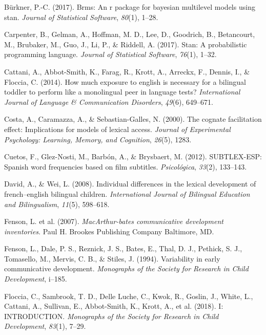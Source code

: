 \documentclass[
  letterpaper,
  DIV=11,
  numbers=noendperiod]{scrartcl}
\newlength{\cslhangindent}
\newlength{\cslentryspacingunit} %
\newenvironment{CSLReferences}[2] %
 {%
  \setlength{\parindent}{0pt}
  \ifodd #1
  \let\oldpar\par
  \def\par{\hangindent=\cslhangindent\oldpar}
  \fi
  \setlength{\parskip}{#2\cslentryspacingunit}
 }%
 {}
\begin{document}
\begin{CSLReferences}{1}{0}
\leavevmode{}%
Bürkner, P.-C. (2017). Brms: An r package for bayesian multilevel models
using stan. \emph{Journal of Statistical Software}, \emph{80}(1), 1--28.

\leavevmode{}%
Carpenter, B., Gelman, A., Hoffman, M. D., Lee, D., Goodrich, B.,
Betancourt, M., Brubaker, M., Guo, J., Li, P., \& Riddell, A. (2017).
Stan: A probabilistic programming language. \emph{Journal of Statistical
Software}, \emph{76}(1), 1--32.

\leavevmode{}%
Cattani, A., Abbot-Smith, K., Farag, R., Krott, A., Arreckx, F., Dennis,
I., \& Floccia, C. (2014). How much exposure to english is necessary for
a bilingual toddler to perform like a monolingual peer in language
tests? \emph{International Journal of Language \& Communication
Disorders}, \emph{49}(6), 649--671.

\leavevmode{}%
Costa, A., Caramazza, A., \& Sebastian-Galles, N. (2000). The cognate
facilitation effect: Implications for models of lexical access.
\emph{Journal of Experimental Psychology: Learning, Memory, and
Cognition}, \emph{26}(5), 1283.

\leavevmode{}%
Cuetos, F., Glez-Nosti, M., Barbón, A., \& Brysbaert, M. (2012).
SUBTLEX-ESP: Spanish word frequencies based on film subtitles.
\emph{Psicol{ó}gica}, \emph{33}(2), 133--143.

\leavevmode{}%
David, A., \& Wei, L. (2008). Individual differences in the lexical
development of french--english bilingual children. \emph{International
Journal of Bilingual Education and Bilingualism}, \emph{11}(5),
598--618.

\leavevmode{}%
Fenson, L. et al. (2007). \emph{MacArthur-bates communicative
development inventories}. Paul H. Brookes Publishing Company Baltimore,
MD.

\leavevmode{}%
Fenson, L., Dale, P. S., Reznick, J. S., Bates, E., Thal, D. J.,
Pethick, S. J., Tomasello, M., Mervis, C. B., \& Stiles, J. (1994).
Variability in early communicative development. \emph{Monographs of the
Society for Research in Child Development}, i--185.

\leavevmode{}%
Floccia, C., Sambrook, T. D., Delle Luche, C., Kwok, R., Goslin, J.,
White, L., Cattani, A., Sullivan, E., Abbot-Smith, K., Krott, A., et al.
(2018). I: INTRODUCTION. \emph{Monographs of the Society for Research in
Child Development}, \emph{83}(1), 7--29.


\end{CSLReferences}
\end{document}
